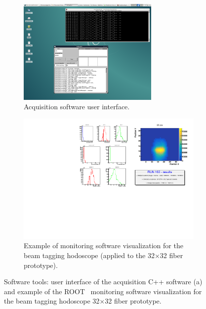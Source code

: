 \begin{figure}
\begin{subfigure}[t]{.5\textwidth}
\centering
\includegraphics[width=0.75\textwidth]{03_GraphicFiles/chapter3_CLaRySproto/Electronics_Acquisition/DAQsoft.png}
\caption{Acquisition software user interface.}
\label{chap3::fig::daqSoftware}
\end{subfigure}
\begin{subfigure}[t]{.5\textwidth}
\centering
\includegraphics[width=1\textwidth]{03_GraphicFiles/chapter3_CLaRySproto/Electronics_Acquisition/monitoringEx.pdf}
\caption{Example of monitoring software visualization for the beam tagging hodoscope (applied to the 32$\times$32 fiber prototype).}
\label{chap3::fig::monitoringSoftware}
\end{subfigure}
\caption{Software tools: user interface of the acquisition C++ software (a) and example of the ROOT~\parencite{Brun1997} monitoring software visualization for the beam tagging hodoscope 32$\times$32 fiber prototype.}
\label{chap3::fig::SoftwareAll}
\end{figure}

